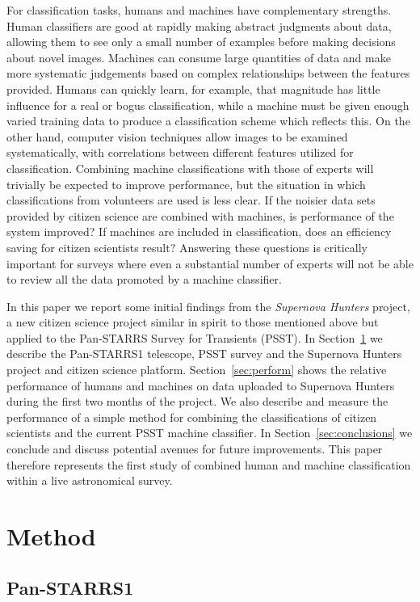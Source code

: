 \message{ !name(blank.tex)}\documentclass[a4paper,fleqn,usenatbib]{mnras}
\begin{document}
For classification tasks, humans and machines have complementary strengths. Human classifiers are good at rapidly making abstract judgments about data, allowing them to see only a small number of examples before making decisions about novel images.  Machines can consume large quantities of data and make more systematic judgements based on complex relationships between the features provided.  Humans can quickly learn, for example, that magnitude has little influence for a real or bogus classification, while a machine must be given enough varied training data to produce a classification scheme which reflects this. On the other hand, computer vision techniques allow images to be examined systematically, with correlations between different features utilized for classification. Combining machine classifications with those of experts will trivially be expected to improve performance, but the situation in which classifications from volunteers are used is less clear. If the noisier data sets provided by citizen science are combined with machines, is performance of the system improved? If machines are included in classification, does an efficiency saving for citizen scientists result? Answering these questions is critically important for surveys where even a substantial number of experts will not be able to review all the data promoted by a machine classifier. 

In this paper we report some initial findings from the \textit{Supernova Hunters} project, a new citizen science project similar in spirit to those mentioned above but applied to the Pan-STARRS Survey for Transients (PSST).  In Section~\ref{sec:method} we describe the Pan-STARRS1 telescope, PSST survey and the Supernova Hunters project and citizen science platform.  Section~\ref{sec:perform} shows the relative performance of humans and machines on data uploaded to Supernova Hunters during the first two months of the project.  We also describe and measure the performance of a simple method for combining the classifications of citizen scientists and the current PSST machine classifier.  In Section~\ref{sec:conclusions} we conclude and discuss potential avenues for future improvements. This paper therefore represents the first study of combined human and machine classification within a live astronomical survey. 


\section{Method}
\label{sec:method}
\subsection{Pan-STARRS1}
\label{sec:ps1}
\end{document}
